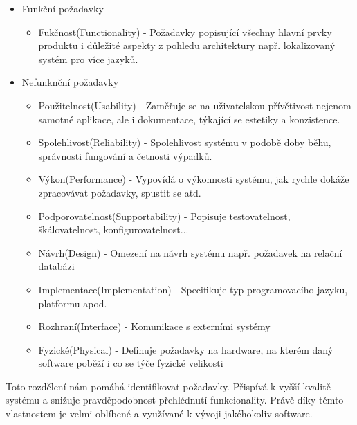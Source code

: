 	\begin{itemize}
		\item Funkční požadavky
			\begin{itemize}
				\item Fukčnost(Functionality) - Požadavky popisující všechny hlavní prvky produktu i důležité aspekty z pohledu architektury např. lokalizovaný systém pro více jazyků.
			\end{itemize}
		\item Nefunknční požadavky
			\begin{itemize}
				\item Použitelnost(Usability) - Zaměřuje se na uživatelskou přívětivost nejenom samotné aplikace, ale i dokumentace, týkající se estetiky a konzistence.
				\item Spolehlivost(Reliability) - Spolehlivost systému v podobě doby běhu, správnosti fungování a četnosti výpadků.
				\item Výkon(Performance) - Vypovídá o výkonnosti systému, jak rychle dokáže zpracovávat požadavky, spustit se atd.
				\item Podporovatelnost(Supportability) - Popisuje testovatelnost, škálovatelnost, konfigurovatelnost...
				\item Návrh(Design) - Omezení na návrh systému např. požadavek na relační databázi
				\item Implementace(Implementation) - Specifikuje typ programovacího jazyku, platformu apod.
				\item Rozhraní(Interface) - Komunikace s externími systémy
				\item Fyzické(Physical) - Definuje požadavky na hardware, na kterém daný software poběží i co se týče fyzické velikosti
			\end{itemize}
	\end{itemize}
	
	Toto rozdělení nám pomáhá identifikovat požadavky. Přispívá k vyšší kvalitě systému a snižuje pravděpodobnost přehlédnutí funkcionality. Právě díky těmto vlastnostem je velmi oblíbené a využívané k vývoji jakéhokoliv software. 